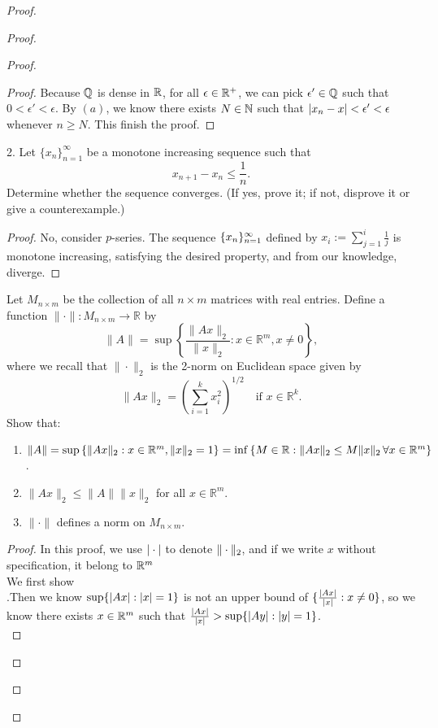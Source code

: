 \documentclass{report}
\begin{document}
\begin{proof}
\begin{proof}
\begin{proof}
\begin{proof}
Because $\mathbb{Q}$ is dense in  $\mathbb{R}$,  for all $\epsilon \in \mathbb{R}^+$, we can pick $\epsilon' \in \mathbb{Q}$ such that $0<\epsilon '< \epsilon $. By $(a)$,  we know there exists $N\in \mathbb{N}$ such that $|x_n-x|<\epsilon ' <\epsilon $ whenever $n\geq N$. This finish the proof.
\end{proof}
\begin{question}{}{}
2. Let $\{x_n\}_{n=1}^{\infty}$ be a monotone increasing sequence such that 
\[x_{n+1} - x_n \leq \frac{1}{n}.\]
Determine whether the sequence converges. (If yes, prove it; if not, disprove it or give a counterexample.)
\end{question}
\begin{proof}
No, consider $p$-series. The sequence $\{ x_n \}_{n=1}^{\infty}$ defined by $x_i:=\sum_{j=1}^i \frac{1}{j}$ is monotone increasing, satisfying the desired property, and from our knowledge, diverge. 
\end{proof}
\begin{question}{}{}
Let $M_{n \times m}$ be the collection of all $n \times m$ matrices with real entries. Define a function $\| \cdot \|: M_{n \times m} \to \mathbb{R}$ by
\[
\| A \| = \sup \left\{ \frac{\|Ax\|_2}{\|x\|_2} : x \in \mathbb{R}^m, x \neq 0 \right\},
\]
where we recall that $\| \cdot \|_2$ is the 2-norm on Euclidean space given by
\[
\| Ax \|_2 = \left( \sum_{i=1}^{k} x_i^2 \right)^{1/2} \quad \text{if } x \in \mathbb{R}^k.
\]
Show that:
\begin{enumerate}
    \item $\| A \| = \sup \left\{ \|Ax\|_2 : x \in \mathbb{R}^m, \| x \|_2 =1 \right\} = \inf \left\{ M \in \mathbb{R} : \|Ax\|_2 \leq M \|x\|_2 \, \forall x \in \mathbb{R}^m \right\}$.
    \item $\| Ax \|_2 \leq \| A \| \| x \|_2$ for all $x \in \mathbb{R}^m$.
    \item $\| \cdot \|$ defines a norm on $M_{n \times m}$.
\end{enumerate}
\end{question}
\begin{proof}
In this proof, we use $|\cdot|$ to denote $\| \cdot \|_2$, and if we write $x$ without specification, it belong to  $\mathbb{R}^m$\\

We first show \\

.Then we know $ \sup \{ |Ax|:|x|=1 \} $ is not an upper bound of $ \{ \frac{|Ax|}{|x|}:x\neq 0 \} $, so we know there exists $x\in \mathbb{R}^m$ such that $\frac{|Ax|}{|x|}>\sup \{ |Ay|:|y|=1 \}$.\\


\end{proof}
\end{proof}
\end{proof}
\end{proof}
\end{document}
